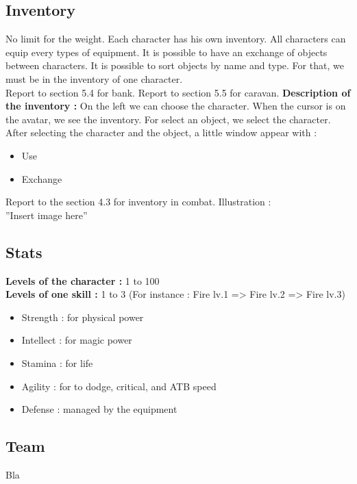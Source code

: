 \documentclass[a4paper,12pt]{book}
\begin{document}
\subsection{Inventory}
No limit for the weight. Each character has his own inventory. All characters can equip every types of equipment. It is possible to have an exchange of objects between characters. It is possible to sort objects by name and type. For that, we must be in the inventory of one character. \\
Report to section 5.4 for bank.
Report to section 5.5 for caravan.
\textbf{Description of the inventory :} On the left we can choose the character. When the cursor is on the avatar, we see the inventory. For select an object, we select the character. After selecting the character and the object, a little window appear with :
\begin{itemize}
\item Use
\item Exchange
\end{itemize}
Report to the section 4.3 for inventory in combat.
Illustration : \\ ''Insert image here''
\subsection{Stats}
\textbf{Levels of the character :} 1 to 100 \\
\textbf{Levels of one skill :} 1 to 3 \newpage (For instance : Fire lv.1 => Fire lv.2 => Fire lv.3)
\begin{itemize}
\item Strength : for physical power
\item Intellect : for magic power
\item Stamina : for life
\item Agility : for to dodge, critical, and ATB speed
\item Defense : managed by the equipment
\end{itemize}
\subsection{Team}
Bla
\end{document}
